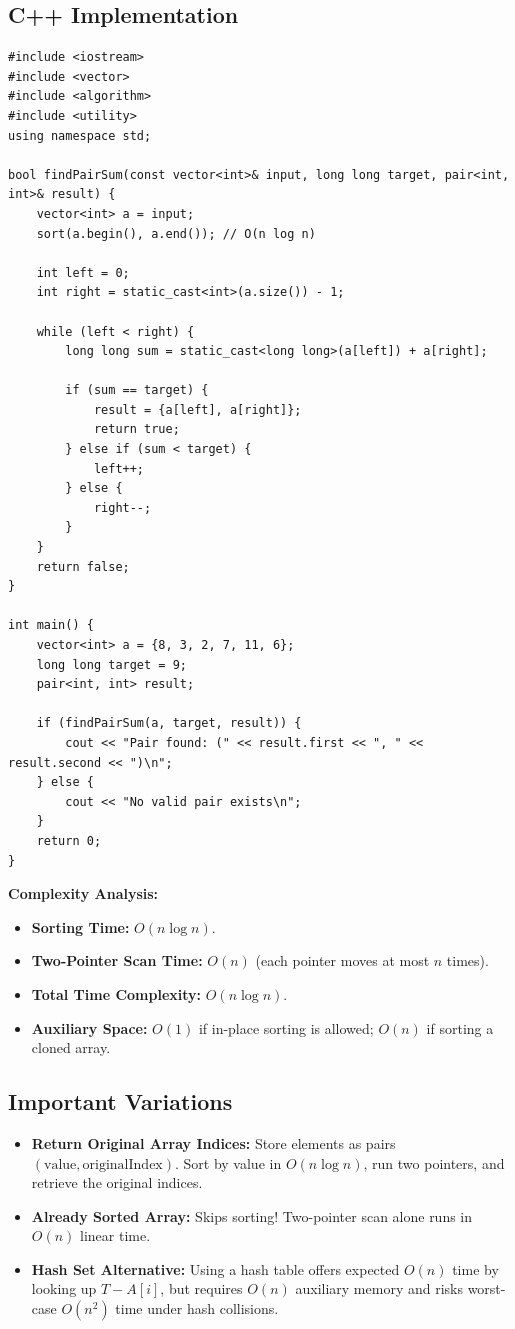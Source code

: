 \subsection{C++ Implementation}

\begin{lstlisting}[style=cppstyle, caption={C++ Solution for Pair-Sum using Sorting and Two Pointers.}]
#include <iostream>
#include <vector>
#include <algorithm>
#include <utility>
using namespace std;

bool findPairSum(const vector<int>& input, long long target, pair<int, int>& result) {
    vector<int> a = input;
    sort(a.begin(), a.end()); // O(n log n)

    int left = 0;
    int right = static_cast<int>(a.size()) - 1;

    while (left < right) {
        long long sum = static_cast<long long>(a[left]) + a[right];

        if (sum == target) {
            result = {a[left], a[right]};
            return true;
        } else if (sum < target) {
            left++;
        } else {
            right--;
        }
    }
    return false;
}

int main() {
    vector<int> a = {8, 3, 2, 7, 11, 6};
    long long target = 9;
    pair<int, int> result;

    if (findPairSum(a, target, result)) {
        cout << "Pair found: (" << result.first << ", " << result.second << ")\n";
    } else {
        cout << "No valid pair exists\n";
    }
    return 0;
}
\end{lstlisting}

\textbf{Complexity Analysis:}
\begin{itemize}
    \item \textbf{Sorting Time:} $O(n \log n)$.
    \item \textbf{Two-Pointer Scan Time:} $O(n)$ (each pointer moves at most $n$ times).
    \item \textbf{Total Time Complexity:} $\boxed{O(n \log n)}$.
    \item \textbf{Auxiliary Space:} $O(1)$ if in-place sorting is allowed; $O(n)$ if sorting a cloned array.
\end{itemize}

\subsection{Important Variations}
\begin{itemize}
    \item \textbf{Return Original Array Indices:} Store elements as pairs $(\text{value}, \text{originalIndex})$. Sort by value in $O(n \log n)$, run two pointers, and retrieve the original indices.
    \item \textbf{Already Sorted Array:} Skips sorting! Two-pointer scan alone runs in $\boxed{O(n)}$ linear time.
    \item \textbf{Hash Set Alternative:} Using a hash table offers expected $O(n)$ time by looking up $T - A[i]$, but requires $O(n)$ auxiliary memory and risks worst-case $O(n^2)$ time under hash collisions.
\end{itemize}

